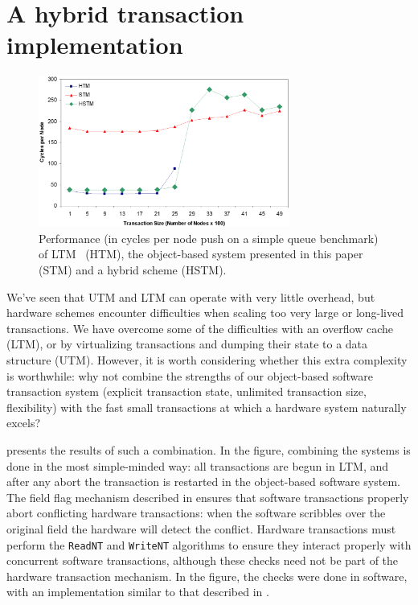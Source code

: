\section{A hybrid transaction implementation}\label{sec:hybrid}

\begin{figure}\begin{center}%
\includegraphics[width=3.25in,clip=true]{Figures/sean_lie_6b}%
\end{center}%
\caption[Hybrid performance on simple queue benchmark.]
{Performance (in cycles per node push on a simple queue
  benchmark) of LTM~\cite{AnanianAsKuLeLi05} (HTM), the
  object-based system presented in this paper (STM) and a hybrid
  scheme (HSTM).}%
\label{fig:hybrid}%
\end{figure}

We've seen that UTM and LTM can operate
with very little overhead, but hardware schemes encounter difficulties
when scaling too very large or long-lived transactions.  We have overcome
some of the difficulties with an overflow
cache (LTM), or by virtualizing transactions and dumping their
state to a data structure (UTM).  However, it is worth
considering whether this extra complexity is worthwhile: why not
combine the strengths of our object-based software transaction system
(explicit transaction state, unlimited transaction size, flexibility)
with the fast small transactions at which a hardware system naturally excels?

 presents the results of such a combination.
In the figure, combining the systems is done
in the most simple-minded way: all transactions are begun in
LTM,
and after any abort the transaction is restarted in the
object-based software system.
  The field flag mechanism described in
 ensures that software transactions properly abort
conflicting hardware transactions: when the software scribbles
\FLAG over the original field the hardware will detect the conflict.
Hardware transactions must perform
the \texttt{ReadNT} and \texttt{WriteNT} algorithms to ensure they
interact properly with concurrent software transactions, although these
checks need not be part of the hardware transaction mechanism.
In the figure, the checks were done in software, with an implementation
similar to that described in .

